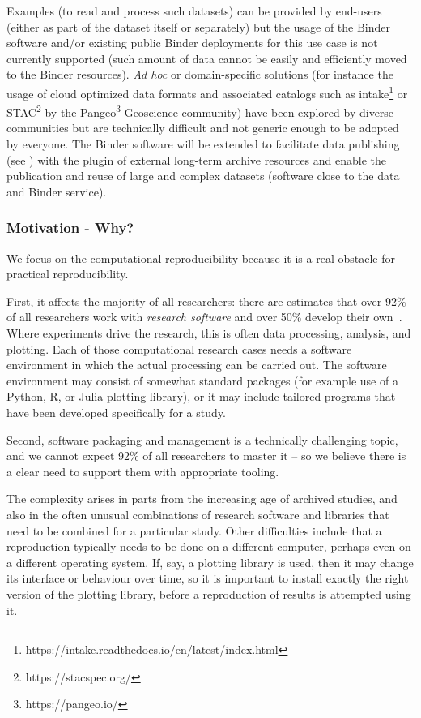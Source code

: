 \begin{compactitem}
      Examples (to read and process such datasets) can be provided by end-users (either as part of the dataset 
      itself or separately) but the usage of the Binder software and/or existing public Binder deployments for 
      this use case is not currently supported (such amount of data cannot be easily and efficiently moved to 
      the Binder resources). \emph{Ad hoc} or domain-specific solutions (for instance the usage of cloud optimized 
      data formats and associated catalogs such as intake\footnote{https://intake.readthedocs.io/en/latest/index.html}
      or STAC\footnote{https://stacspec.org/} by the Pangeo\footnote{https://pangeo.io/} Geoscience community) 
      have been explored by diverse communities but are technically difficult and not generic enough to be 
      adopted by everyone. The Binder software will be extended to facilitate data publishing (see ) with 
      the plugin of external long-term archive resources and enable the publication and reuse of large and complex datasets (software close to 
      the data and Binder service). 
\end{compactitem}


\subsubsection{Motivation - Why?}\label{sec:motivation-why}

We focus on the computational reproducibility because it is a real
obstacle for practical reproducibility.

First, it affects the majority of all researchers: there are estimates that over
92\% of all researchers work with \emph{research software} and over 50\% develop
their own~\cite{Hettrick2014}. Where experiments drive the research, this is
often data processing, analysis, and plotting. Each of those computational
research cases needs a software environment in which the actual processing can
be carried out. The software environment may consist of somewhat standard
packages (for example use of a Python, R, or Julia plotting library), or it may
include tailored programs that have been developed specifically for a study.

Second, software packaging and management is a technically challenging topic,
and we cannot expect 92\% of all researchers to master it -- so we believe there
is a clear need to support them with appropriate tooling.

The complexity arises in parts from the increasing age of archived studies, and
also in the often unusual combinations of research software and libraries that
need to be combined for a particular study. Other difficulties include that a
reproduction typically needs to be done on a different computer, perhaps even on
a different operating system. If, say, a plotting library is used, then it may
change its interface or behaviour over time, so it is important to install
exactly the right version of the plotting library, before a reproduction of
results is attempted using it.

